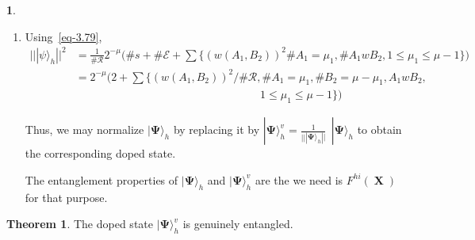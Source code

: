 \documentclass[a4paper,12pt]{article}
\DeclareMathOperator{\x}{\mathrm{X}}
\theoremstyle{definition}
\theoremstyle{underlinethm}
\newtheorem{thm}{Theorem}[section]
\theoremstyle{definition}
\newtheorem{subsubsec}{}[subsection]
\begin{document}
\begin{subsubsec}
\begin{enumerate}[label=(\alph*)]
\item Using~\eqref{eq-3.79}, 
\begin{align*}
|| | \psi \rangle_{h} ||^{2} &= \frac{1}{\# \mathcal{R}} 2^{-\mu} \bigg(\# s + \# \mathcal{E} + \sum\bigg\{ (w(A_{1}, B_{2}))^{2} \# A_{1}=\mu_{1}, \# A_{1} wB_{2}, 1 \leq \mu_{1} \leq \mu-1\bigg\}\bigg) \\
& = 2^{-\mu} \bigg(2 + \sum \bigg\{(w(A_{1}, B_{2}))^{2} /\# \mathcal{R}, \# A_{1}=\mu_{1}, \# B_{2}=\mu-\mu_{1}, A_{1}wB_{2},\\&\hspace{7cm} 1 \leq \mu_{1} \leq \mu-1 \bigg\} \bigg)\tag{3.80}\label{eq-3.80}
\end{align*}

Thus, we may normalize $| \boldsymbol{\Psi} \rangle_{h}$ by replacing it by $| \boldsymbol{\Psi} \rangle_{h}^{v} = \frac{1}{|| | \boldsymbol{\Psi}\rangle_{h}||} ~~ | \boldsymbol{\Psi} \rangle_{h}$ to obtain the corresponding doped state.

The entanglement properties of $| \boldsymbol{\Psi} \rangle_{h}$ and $| \boldsymbol{\Psi}\rangle_{h}^{v}$ are the we need is $F^{hi}(\boldsymbol{\x})$ for that purpose.
\end{enumerate}
\end{subsubsec}

\begin{thm}\label{thm-3.9}
The doped state $| \boldsymbol{\Psi}\rangle_{h}^{v}$ is genuinely entangled.
\end{thm}
\end{document}
